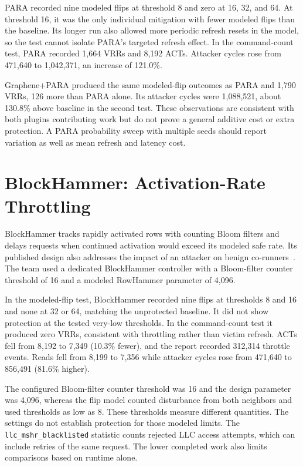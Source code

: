 \documentclass[11pt,letterpaper]{article}
\begin{document}
PARA recorded nine modeled flips at threshold 8 and zero at 16, 32, and 64. At threshold 16, it was the only individual mitigation with fewer modeled flips than the baseline. Its longer run also allowed more periodic refresh resets in the model, so the test cannot isolate PARA's targeted refresh effect. In the command-count test, PARA recorded 1,664 VRRs and 8,192 ACTs. Attacker cycles rose from 471,640 to 1,042,371, an increase of 121.0\%.

Graphene+PARA produced the same modeled-flip outcomes as PARA and 1,790 VRRs, 126 more than PARA alone. Its attacker cycles were 1,088,521, about 130.8\% above baseline in the second test. These observations are consistent with both plugins contributing work but do not prove a general additive cost or extra protection. A PARA probability sweep with multiple seeds should report variation as well as mean refresh and latency cost.

\section{BlockHammer: Activation-Rate Throttling}
BlockHammer tracks rapidly activated rows with counting Bloom filters and delays requests when continued activation would exceed its modeled safe rate. Its published design also addresses the impact of an attacker on benign co-runners~\cite{blockhammer2021}. The team used a dedicated BlockHammer controller with a Bloom-filter counter threshold of 16 and a modeled RowHammer parameter of 4,096.

In the modeled-flip test, BlockHammer recorded nine flips at thresholds 8 and 16 and none at 32 or 64, matching the unprotected baseline. It did not show protection at the tested very-low thresholds. In the command-count test it produced zero VRRs, consistent with throttling rather than victim refresh. ACTs fell from 8,192 to 7,349 (10.3\% fewer), and the report recorded 312,314 throttle events. Reads fell from 8,199 to 7,356 while attacker cycles rose from 471,640 to 856,491 (81.6\% higher).

The configured Bloom-filter counter threshold was 16 and the design parameter was 4,096, whereas the flip model counted disturbance from both neighbors and used thresholds as low as 8. These thresholds measure different quantities. The settings do not establish protection for those modeled limits. The \texttt{llc\_mshr\_blacklisted} statistic counts rejected LLC access attempts, which can include retries of the same request. The lower completed work also limits comparisons based on runtime alone.
\end{document}
